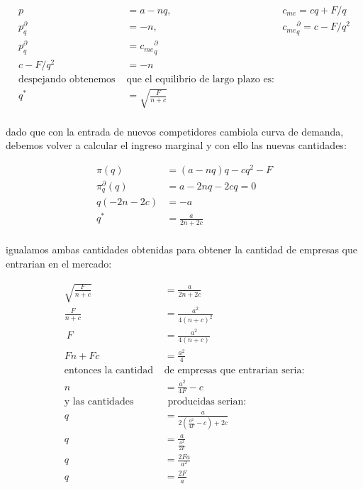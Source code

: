 \documentclass[11pt]{article}
\begin{document}
\begin{flushleft}
\begin{example}
        \begin{align*}
            p&=a-nq,~~~~&c_{me}=cq+F/q\\
            p^\partial_q&=-n,~~~~&{c_{me}}^\partial_q=c-F/q^2\\
            p^\partial_q&={c_{me}}^\partial_q\\
            c-F/q^2&=-n\\
            \text{despejando obtenemos }&\text{que el equilibrio de largo plazo es:}\\
            q^*&=\sqrt{\frac{F}{n+c}}\\
        \end{align*}
        
        dado que con la entrada de nuevos competidores cambiola curva de demanda, debemos volver a calcular el ingreso marginal y con ello las nuevas cantidades:

        \begin{align*}
            \pi(q)&=(a-nq)q-cq^2-F\\
            \pi^\partial_q(q)&=a-2nq-2cq=0\\
            q(-2n-2c)&=-a\\
            q^*&=\frac{a}{2n+2c}\\
        \end{align*}
        
        igualamos ambas cantidades obtenidas para obtener la cantidad de empresas que entrarian en el mercado:

        \begin{align*}
            \sqrt{\frac{F}{n+c}}&=\frac{a}{2n+2c}\\
            \frac{F}{n+c}&=\frac{a^2}{4(n+c)^2}\\\
            F&=\frac{a^2}{4(n+c)}\\
            Fn+Fc&=\frac{a^2}{4}\\
            \text{entonces la cantidad }&\text{de empresas que entrarian seria:}\\
            n&=\frac{a^2}{4F}-c\\
            \text{y las cantidades}&\text{ producidas serian:}\\
            q&=\frac{a}{2\left(\frac{a^2}{4F}-c\right)+2c}\\
            q&=\frac{a}{\frac{a^2}{2F}}\\
            q&=\frac{2Fa}{a^2}\\
            q&=\frac{2F}{a}\\
        \end{align*}


\end{example}
\end{flushleft}
\end{document}
